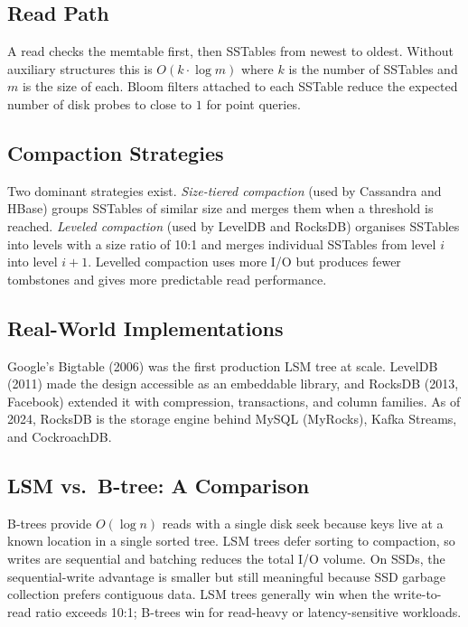 \subsection{Read Path}

A read checks the memtable first, then SSTables from newest to oldest.  Without
auxiliary structures this is $O(k \cdot \log m)$ where $k$ is the number of SSTables
and $m$ is the size of each.  Bloom filters attached to each SSTable reduce the
expected number of disk probes to close to $1$ for point queries.

\subsection{Compaction Strategies}

Two dominant strategies exist.  \emph{Size-tiered compaction} (used by Cassandra
and HBase) groups SSTables of similar size and merges them when a threshold is
reached.  \emph{Leveled compaction} (used by LevelDB and RocksDB) organises SSTables
into levels with a size ratio of 10:1 and merges individual SSTables from level $i$
into level $i+1$.  Levelled compaction uses more I/O but produces fewer tombstones
and gives more predictable read performance.

\subsection{Real-World Implementations}

Google's Bigtable (2006) was the first production LSM tree at scale.  LevelDB
(2011) made the design accessible as an embeddable library, and RocksDB (2013,
Facebook) extended it with compression, transactions, and column families.  As of
2024, RocksDB is the storage engine behind MySQL (MyRocks), Kafka Streams, and
CockroachDB.

\subsection{LSM vs.\ B-tree: A Comparison}

B-trees provide $O(\log n)$ reads with a single disk seek because keys live at a
known location in a single sorted tree.  LSM trees defer sorting to compaction, so
writes are sequential and batching reduces the total I/O volume.  On SSDs, the
sequential-write advantage is smaller but still meaningful because SSD garbage
collection prefers contiguous data.  LSM trees generally win when the
write-to-read ratio exceeds 10:1; B-trees win for read-heavy or latency-sensitive
workloads.

